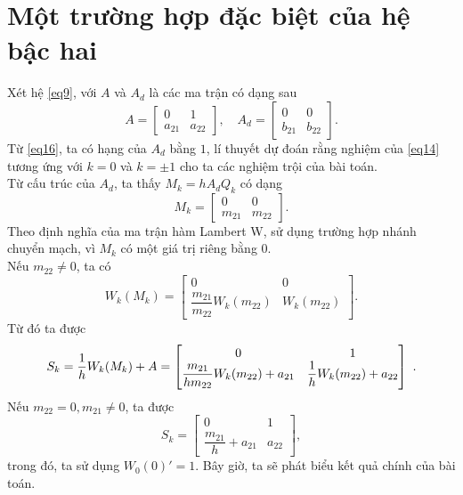 \section{Một trường hợp đặc biệt của hệ bậc hai}\label{sec4}
Xét hệ \eqref{eq9}, với $A$ và $A_d$ là các ma trận có dạng sau
\begin{equation}\label{eq16}
	A= \begin{bmatrix}
		0 &1\\
		a_{21} &a_{22}
	\end{bmatrix}, \quad
	A_d= \begin{bmatrix}
		0 &0\\
		b_{21} &b_{22}
	\end{bmatrix}.
\end{equation}
Từ \eqref{eq16}, ta có hạng của $A_d$ bằng $1$, lí thuyết dự đoán rằng nghiệm của \eqref{eq14} tương ứng với $k =0$ và $k = \pm1$ cho ta các nghiệm trội của bài toán. \\
Từ cấu trúc của $A_d$, ta thấy $M_k = h  A_d Q_k$ có dạng
\begin{equation}\label{eq17}
	M_k = \begin{bmatrix}
		0 &0\\
		m_{21} &m_{22}
	\end{bmatrix}.
\end{equation}
Theo định nghĩa của ma trận hàm Lambert W, sử dụng trường hợp nhánh chuyển mạch, vì $M_k$ có một giá trị riêng bằng $0$.\\
Nếu $m_{22} \ne 0$, ta có
\begin{equation}\label{eq18}
	W_k(M_k)= \begin{bmatrix}
		0 &0\\
		\dfrac{	m_{21}}{m_{22}} W_k(m_{22}) &W_k(m_{22})
	\end{bmatrix}.
\end{equation}
Từ đó ta được
\begin{equation}\label{eq19}
	S_k = \dfrac{1}{h }W_k(M_k)+A = 
	\begin{bmatrix} 0 &1\\
		\dfrac{	m_{21}}{h  m_{22}} W_k(m_{22}) +a_{21} &\dfrac{1}{h }W_k(m_{22})+a_{22} \end{bmatrix}
	 \ .
\end{equation}
Nếu $m_{22}=0, m_{21} \ne 0$, ta được
\begin{equation}\label{eq20}
	S_k	= \begin{bmatrix}
		0 &1\\
		\dfrac{	m_{21}}{h } +a_{21} &a_{22}
	\end{bmatrix},
\end{equation}
trong đó, ta sử dụng $W_0 (0)' =1$. Bây giờ, ta sẽ phát biểu kết quả chính của bài toán.\\

